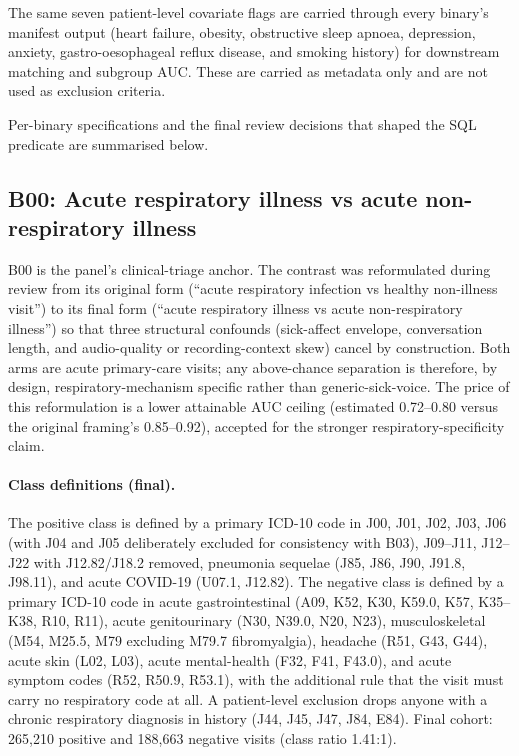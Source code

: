\documentclass[utf8]{frontiers_suppmat} %
\begin{document}
The same seven patient-level covariate flags are carried through every
binary's manifest output (heart failure, obesity, obstructive sleep
apnoea, depression, anxiety, gastro-oesophageal reflux disease, and
smoking history) for downstream matching and subgroup AUC. These
are carried as metadata only and are not used as exclusion criteria.

Per-binary specifications and the final review decisions that shaped
the SQL predicate are summarised below.

\subsection{B00: Acute respiratory illness vs acute non-respiratory illness}
\label{sec:supp-b00}

B00 is the panel's clinical-triage anchor. The contrast was reformulated
during review from its original form (``acute respiratory infection
vs healthy non-illness visit'') to its final form (``acute respiratory
illness vs acute non-respiratory illness'') so that three structural
confounds (sick-affect envelope, conversation length, and audio-quality
or recording-context skew) cancel by construction. Both arms are
acute primary-care visits; any above-chance separation is therefore,
by design, respiratory-mechanism specific rather than generic-sick-voice.
The price of this reformulation is a lower attainable AUC ceiling
(estimated 0.72--0.80 versus the original framing's 0.85--0.92), accepted
for the stronger respiratory-specificity claim.

\paragraph{Class definitions (final).} The positive class is
defined by a primary ICD-10 code in J00, J01, J02, J03, J06 (with J04
and J05 deliberately excluded for consistency with B03), J09--J11,
J12--J22 with J12.82/J18.2 removed, pneumonia sequelae
(J85, J86, J90, J91.8, J98.11), and acute COVID-19 (U07.1,
J12.82). The negative class is defined by a primary ICD-10 code in
acute gastrointestinal (A09, K52, K30, K59.0, K57, K35--K38, R10, R11),
acute genitourinary (N30, N39.0, N20, N23), musculoskeletal (M54,
M25.5, M79 excluding M79.7 fibromyalgia), headache (R51, G43, G44),
acute skin (L02, L03), acute mental-health (F32, F41, F43.0), and
acute symptom codes (R52, R50.9, R53.1), with the additional rule
that the visit must carry no respiratory code at all. A patient-level
exclusion drops anyone with a chronic respiratory diagnosis in history
(J44, J45, J47, J84, E84). Final cohort: 265{,}210 positive and
188{,}663 negative visits (class ratio 1.41:1).
\end{document}
